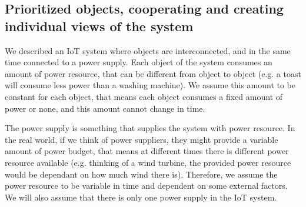 \documentclass[letterpaper, 10 pt, conference]{ieeeconf}
\begin{document}
\subsection{Prioritized objects, cooperating and creating individual views of the system}
We described an IoT system where objects are interconnected, and in the same time connected to a power supply. Each object of the system consumes an amount of power resource, that can be different from object to object (e.g. a toast will consume less power than a washing machine). We assume this amount to be constant for each object, that means each object consumes a fixed amount of power or none, and this amount cannot change in time.

The power supply is something that supplies the system with power resource. In the real world, if we think of power suppliers, they might provide a variable amount of power budget, that means at different times there is different power resource available (e.g. thinking of a wind turbine, the provided power resource would be dependant on how much wind there is). Therefore, we assume the power resource to be variable in time and dependent on some external factors. We will also assume that there is only one power supply in the IoT system.
\end{document}
